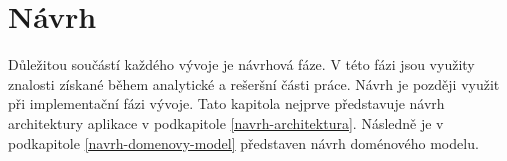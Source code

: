 \chapter{Návrh}\label{kapitola-navrh}
Důležitou součástí každého vývoje je návrhová fáze. V této fázi jsou využity znalosti získané během analytické a rešeršní části práce. Návrh je později využit při implementační fázi vývoje. Tato kapitola nejprve představuje návrh architektury aplikace v podkapitole \ref{navrh-architektura}. Následně je v podkapitole \ref{navrh-domenovy-model} představen návrh doménového modelu.


